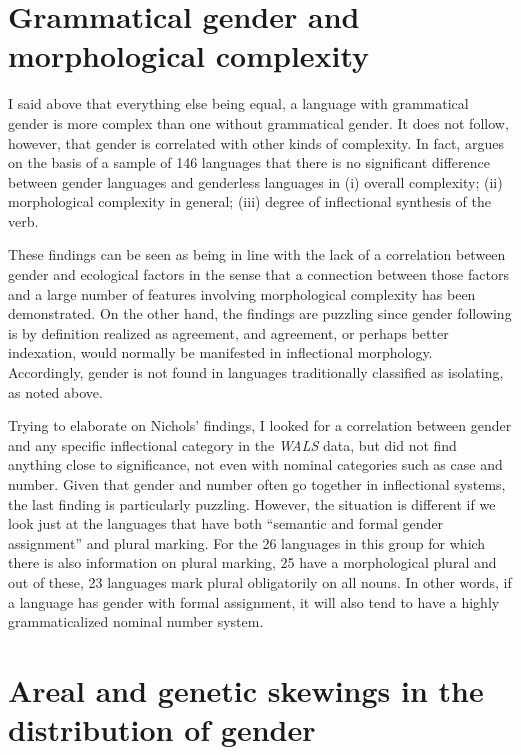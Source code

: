 \documentclass[output=collectionpaper]{langsci/langscibook}
\begin{document}
\section{Grammatical gender and morphological complexity}

I said above that everything else being equal, a language with grammatical gender is more complex than one without grammatical gender. It does not follow, however, that gender is correlated with other kinds of complexity. In fact,  argues on the basis of a sample of 146 languages that there is no significant difference between gender languages and genderless languages in (i) overall complexity; (ii) morphological complexity in general; (iii) degree of inflectional synthesis of the verb.

These findings can be seen as being in line with the lack of a correlation between gender and ecological factors in the sense that a connection between those factors and a large number of features involving morphological complexity has been demonstrated. On the other hand, the findings are puzzling since gender \textendash{} following \citet[4]{Corbett1991} \textendash{} is by definition realized as agreement, and agreement, or perhaps better indexation, would normally be manifested in inflectional morphology. Accordingly, gender is not found in languages traditionally classified as isolating, as noted above.

Trying to elaborate on Nichols’ findings, I looked for a correlation between gender and any specific inflectional category in the \textit{WALS} data, but did not find anything close to significance, not even with nominal categories such as case and number. Given that gender and number often go together in inflectional systems, the last finding is particularly puzzling. However, the situation is different if we look just at the languages that have both ``semantic and formal gender assignment'' and plural marking. For the 26 languages in this group for which there is also information on plural marking, 25 have a morphological plural and out of these, 23 languages mark plural obligatorily on all nouns. In other words, if a language has gender with formal assignment, it will also tend to have a highly grammaticalized nominal number system.

\section{Areal and genetic skewings in the distribution of gender}
\end{document}
